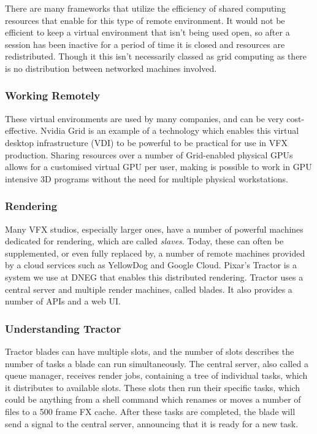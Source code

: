 There are many frameworks that utilize the efficiency of shared computing resources that enable for this type of remote environment. It would not be efficient to keep a virtual environment that isn't being used open, so after a session has been inactive for a period of time it is closed and resources are redistributed. Though it this isn't necessarily classed as grid computing as there is no distribution between networked machines involved.

\hypertarget{working-remotely}{%
\subsubsection{Working Remotely}\label{working-remotely}}

These virtual environments are used by many companies, and can be very cost-effective. Nvidia Grid is an example of a technology which enables this virtual desktop infrastructure (VDI) to be powerful to be practical for use in VFX production. Sharing resources over a number of Grid-enabled physical GPUs allows for a customised virtual GPU per user, making is possible to work in GPU intensive 3D programs without the need for multiple physical workstations.

\hypertarget{rendering}{%
\subsubsection{Rendering}\label{rendering}}

Many VFX studios, especially larger ones, have a number of powerful machines dedicated for rendering, which are called \emph{slaves}. Today, these can often be supplemented, or even fully replaced by, a number of remote machines provided by a cloud services such as YellowDog and Google Cloud. Pixar's Tractor is a system we use at DNEG that enables this distributed rendering. Tractor uses a central server and multiple render machines, called blades. It also provides a number of APIs and a web UI.

\hypertarget{understanding-tractor}{%
\subsubsection{Understanding Tractor}\label{understanding-tractor}}

Tractor blades can have multiple slots, and the number of slots describes the number of tasks a blade can run simultaneously. The central server, also called a queue manager, receives render jobs, containing a tree of individual tasks, which it distributes to available slots. These slots then run their specific tasks, which could be anything from a shell command which renames or moves a number of files to a 500 frame FX cache. After these tasks are completed, the blade will send a signal to the central server, announcing that it is ready for a new task.

